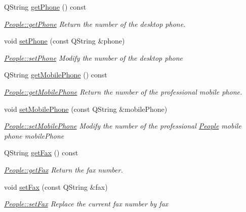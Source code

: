 \begin{DoxyCompactItemize}
Q\+String \hyperlink{classModels_1_1People_a4e30c7e027f2be5c8bc7813e37e12f94}{get\+Phone} () const 
\begin{DoxyCompactList}\small\item\em \hyperlink{classModels_1_1People_a4e30c7e027f2be5c8bc7813e37e12f94}{People\+::get\+Phone} Return the number of the desktop phone. \end{DoxyCompactList}\item 
void \hyperlink{classModels_1_1People_adea0f24c3438d7c65a6df522e3253863}{set\+Phone} (const Q\+String \&phone)
\begin{DoxyCompactList}\small\item\em \hyperlink{classModels_1_1People_adea0f24c3438d7c65a6df522e3253863}{People\+::set\+Phone} Modify the number of the desktop {\itshape phone} \end{DoxyCompactList}\item 
Q\+String \hyperlink{classModels_1_1People_aaf8d6ac89ea0ae0a1064503f3b9b6dbb}{get\+Mobile\+Phone} () const 
\begin{DoxyCompactList}\small\item\em \hyperlink{classModels_1_1People_aaf8d6ac89ea0ae0a1064503f3b9b6dbb}{People\+::get\+Mobile\+Phone} Return the number of the professional mobile phone. \end{DoxyCompactList}\item 
void \hyperlink{classModels_1_1People_a38e71d8991c2ef70f4f3f4b864913a58}{set\+Mobile\+Phone} (const Q\+String \&mobile\+Phone)
\begin{DoxyCompactList}\small\item\em \hyperlink{classModels_1_1People_a38e71d8991c2ef70f4f3f4b864913a58}{People\+::set\+Mobile\+Phone} Modify the number of the professional \hyperlink{classModels_1_1People}{People} mobile phone {\itshape mobile\+Phone} \end{DoxyCompactList}\item 
Q\+String \hyperlink{classModels_1_1People_a30b8378d221c9f20a66797a526973be9}{get\+Fax} () const 
\begin{DoxyCompactList}\small\item\em \hyperlink{classModels_1_1People_a30b8378d221c9f20a66797a526973be9}{People\+::get\+Fax} Return the fax number. \end{DoxyCompactList}\item 
void \hyperlink{classModels_1_1People_adaa1a83318fd0a251cbcc4a93dc01096}{set\+Fax} (const Q\+String \&fax)
\begin{DoxyCompactList}\small\item\em \hyperlink{classModels_1_1People_adaa1a83318fd0a251cbcc4a93dc01096}{People\+::set\+Fax} Replace the current fax number by {\itshape fax} \end{DoxyCompactList}\item 

\end{DoxyCompactItemize}
